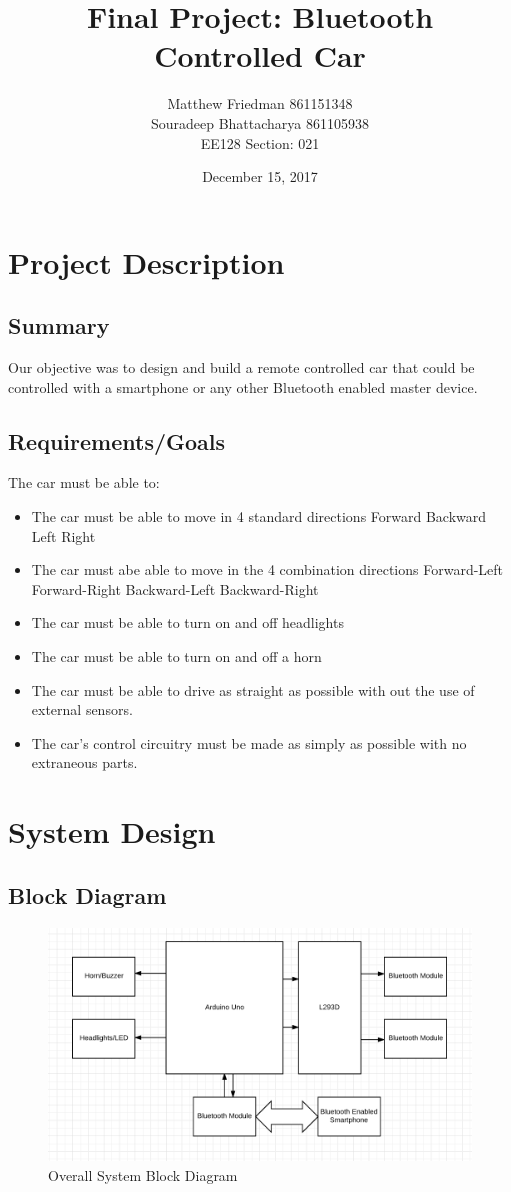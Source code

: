 \documentclass{article}
\title{Final Project: Bluetooth Controlled Car}
\date{December 15, 2017}
\author{Matthew Friedman 861151348\\Souradeep Bhattacharya 861105938\\EE128 Section: 021}
\begin{document}
	\maketitle
	\section*{Project Description}
	\subsection*{Summary}
	\par Our objective was to design and build a remote controlled car that could be controlled with a smartphone or any other Bluetooth enabled master device.
	\subsection*{Requirements/Goals}
	The car must be able to:
	\begin{itemize}
		\item The car must be able to move in 4 standard directions
		\subitem Forward
		\subitem Backward
		\subitem Left
		\subitem Right
		\item The car must abe able to move in the 4 combination directions
		\subitem Forward-Left
		\subitem Forward-Right
		\subitem Backward-Left
		\subitem Backward-Right
		\item The car must be able to turn on and off headlights
		\item The car must be able to turn on and off a horn
		\item The car must be able to drive as straight as possible with out the use of external sensors.
		\item The car's control circuitry must be made as simply as possible with no extraneous parts.
	\end{itemize}
	\section*{System Design}
	\subsection*{Block Diagram}
	\begin{figure}[H]
		\centering
		\includegraphics[scale=0.70]{BD}
		\caption{Overall System Block Diagram}
	\end{figure}
\end{document}
